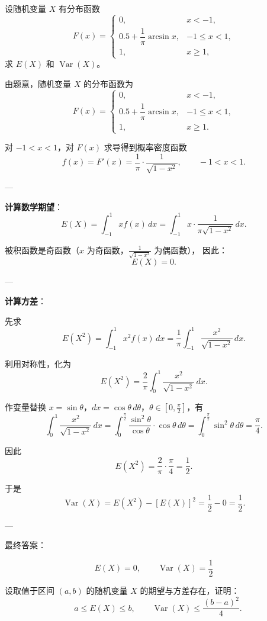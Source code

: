 \begin{homework}[3.14]
设随机变量 $X$ 有分布函数
\[
F(x) =
\begin{cases}
0, & x < -1, \\
0.5 + \dfrac{1}{\pi} \arcsin x, & -1 \le x < 1, \\
1, & x \ge 1,
\end{cases}
\]
求 $E(X)$ 和 $\operatorname{Var}(X)$。
\end{homework}
\begin{solution}
由题意，随机变量 $X$ 的分布函数为
\[
F(x) =
\begin{cases}
0, & x < -1,\\[6pt]
0.5 + \dfrac{1}{\pi}\arcsin x, & -1 \le x < 1,\\[6pt]
1, & x \ge 1.
\end{cases}
\]

对 $-1 < x < 1$，对 $F(x)$ 求导得到概率密度函数
\[
f(x) = F'(x) = \frac{1}{\pi}\cdot \frac{1}{\sqrt{1-x^2}},\qquad -1 < x < 1.
\]

---

\textbf{计算数学期望}：
\[
E(X) = \int_{-1}^{1} x f(x) \, dx
      = \int_{-1}^{1} x \cdot \frac{1}{\pi \sqrt{1-x^2}}\, dx.
\]

被积函数是奇函数（$x$ 为奇函数，$\frac{1}{\sqrt{1-x^2}}$ 为偶函数），
因此：
\[
E(X) = 0.
\]

---

\textbf{计算方差}：

先求
\[
E\!\left(X^2\right)
= \int_{-1}^{1} x^2 f(x)\, dx
= \frac{1}{\pi}\int_{-1}^{1} \frac{x^2}{\sqrt{1-x^2}}\, dx.
\]

利用对称性，化为
\[
E(X^2) = \frac{2}{\pi}\int_{0}^{1} \frac{x^2}{\sqrt{1-x^2}}\, dx.
\]

作变量替换 $x=\sin\theta$，$dx=\cos\theta \, d\theta$，$\theta \in [0,\frac{\pi}{2}]$，有
\[
\int_{0}^{1} \frac{x^2}{\sqrt{1-x^2}}\, dx
= \int_{0}^{\frac{\pi}{2}} \frac{\sin^2\theta}{\cos\theta} \cdot \cos\theta\, d\theta
= \int_{0}^{\frac{\pi}{2}} \sin^2\theta\, d\theta 
= \frac{\pi}{4}.
\]

因此
\[
E(X^2) = \frac{2}{\pi} \cdot \frac{\pi}{4} = \frac{1}{2}.
\]

于是
\[
\boxed{ \operatorname{Var}(X)=E(X^2)-[E(X)]^2=\frac{1}{2}-0=\frac{1}{2} }.
\]

---

最终答案：

\[
\boxed{E(X)=0,\qquad \operatorname{Var}(X)=\frac{1}{2}}
\]
\end{solution}
\begin{homework}[3.16]
设取值于区间 $(a, b)$ 的随机变量 $X$ 的期望与方差存在，证明：
\[
\quad a \le E(X) \le b, \qquad
\operatorname{Var}(X) \le \frac{(b - a)^2}{4}.
\]
\end{homework}

